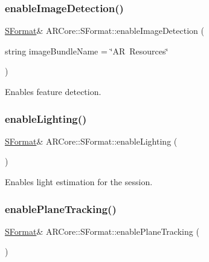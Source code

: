 \subsubsection{\texorpdfstring{enable\+Image\+Detection()}{enableImageDetection()}}
{\footnotesize\ttfamily \mbox{\hyperlink{class_a_r_core_1_1_s_format}{S\+Format}}\& A\+R\+Core\+::\+S\+Format\+::enable\+Image\+Detection (\begin{DoxyParamCaption}\item[{string}]{image\+Bundle\+Name = {\ttfamily \char`\"{}AR~Resources\char`\"{}} }\end{DoxyParamCaption})\hspace{0.3cm}{\ttfamily [inline]}}



Enables feature detection. 

\mbox{\label{class_a_r_core_1_1_s_format_a3e4a19abf7ccdb7911148dcbc016e08d}} 
\subsubsection{\texorpdfstring{enable\+Lighting()}{enableLighting()}}
{\footnotesize\ttfamily \mbox{\hyperlink{class_a_r_core_1_1_s_format}{S\+Format}}\& A\+R\+Core\+::\+S\+Format\+::enable\+Lighting (\begin{DoxyParamCaption}{ }\end{DoxyParamCaption})\hspace{0.3cm}{\ttfamily [inline]}}



Enables light estimation for the session. 

\mbox{\label{class_a_r_core_1_1_s_format_a645b86ef5095920838f8a826ae77ced1}} 
\subsubsection{\texorpdfstring{enable\+Plane\+Tracking()}{enablePlaneTracking()}}
{\footnotesize\ttfamily \mbox{\hyperlink{class_a_r_core_1_1_s_format}{S\+Format}}\& A\+R\+Core\+::\+S\+Format\+::enable\+Plane\+Tracking (\begin{DoxyParamCaption}{ }\end{DoxyParamCaption})\hspace{0.3cm}{\ttfamily [inline]}}



